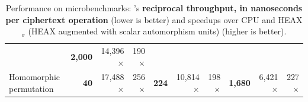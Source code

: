 {\begin{table}[t]
\begin{center}
{\begin{tabular}{l|rrr|rrr|rrr}
        &\textbf{2,000} %
        &14,396$\times$ %
        &190$\times$ %
        \\


        Homomorphic permutation
        &\textbf{40} %
        &17,488$\times$ %
        &256$\times$ %

        &\textbf{224} %
        &10,814$\times$ %
        &198$\times$ %

        &\textbf{1,680} %
        &6,421$\times$ %
        &227$\times$ %
        \\
        
        \bottomrule
      \end{tabular}
      }
      \end{center}
      \caption{Performance on microbenchmarks: \name's \textbf{reciprocal throughput, in nanoseconds per ciphertext operation} (lower is better) and speedups over CPU and HEAX$_\sigma$ (HEAX augmented with scalar automorphism units) (higher is better).}
      \label{tbl:microbenchmark}
  \end{table}
}


